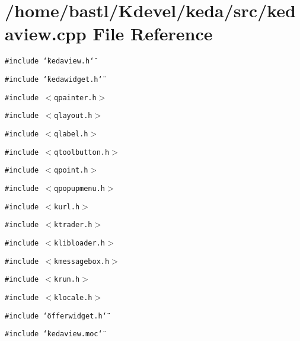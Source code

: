 \section{/home/bastl/Kdevel/keda/src/kedaview.cpp File Reference}
\label{kedaview_8cpp}
{\tt \#include \char`\"{}kedaview.h\char`\"{}}\par
{\tt \#include \char`\"{}kedawidget.h\char`\"{}}\par
{\tt \#include $<$qpainter.h$>$}\par
{\tt \#include $<$qlayout.h$>$}\par
{\tt \#include $<$qlabel.h$>$}\par
{\tt \#include $<$qtoolbutton.h$>$}\par
{\tt \#include $<$qpoint.h$>$}\par
{\tt \#include $<$qpopupmenu.h$>$}\par
{\tt \#include $<$kurl.h$>$}\par
{\tt \#include $<$ktrader.h$>$}\par
{\tt \#include $<$klibloader.h$>$}\par
{\tt \#include $<$kmessagebox.h$>$}\par
{\tt \#include $<$krun.h$>$}\par
{\tt \#include $<$klocale.h$>$}\par
{\tt \#include \char`\"{}offerwidget.h\char`\"{}}\par
{\tt \#include \char`\"{}kedaview.moc\char`\"{}}\par
